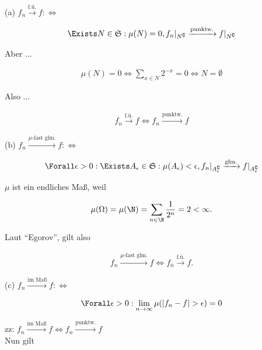 \begin{solution}

(a) $f_n \xrightarrow{\text{f.ü.}} f : \Leftrightarrow$

\begin{align*}
  \Exists N \in \mathfrak{S}:
  \mu(N) = 0,
  f_n|_{N^\complement} \xrightarrow{\text{punktw.}} f|_{N^\complement}
\end{align*}

Aber ...

\begin{align*}
  \mu(N) = 0
  \Leftrightarrow
  \sum_{x \in N} 2^{-x} = 0
  \Leftrightarrow
  N = \emptyset
\end{align*}

Also ...

\begin{align*}
  f_n \xrightarrow{\text{f.ü.}} f
  \Leftrightarrow
  f_n \xrightarrow{\text{punktw.}} f
\end{align*}

(b) $f_n \xrightarrow{\mu \text{-fast glm.}} f : \Leftrightarrow$

\begin{align*}
  \Forall \epsilon > 0:
  \Exists A_\epsilon \in \mathfrak{S}:
  \mu(A_\epsilon) < \epsilon,
  f_n|_{A_\epsilon^\complement} \xrightarrow{\text{glm.}} f|_{A_\epsilon^\complement}
\end{align*}

$\mu$ ist ein endliches Maß, weil

\begin{align*}
  \mu(\Omega) = \mu(\N) = \sum_{n \in \N} \frac{1}{2^n} = 2 < \infty.
\end{align*}

Laut \enquote{Egorov}, gilt also

\begin{align*}
  f_n \xrightarrow{\mu \text{-fast glm.}} f
  \Leftrightarrow
  f_n \xrightarrow{\text{f.ü.}} f.
\end{align*}

(c) $f_n \xrightarrow{\text{im Maß}} f : \Leftrightarrow$

\begin{align*}
  \Forall \epsilon > 0:
  \lim_{n \to \infty} \mu(|f_n - f| > \epsilon) = 0
\end{align*}

zz: $f_n \xrightarrow{\text{im Maß}} f \Leftrightarrow f_n \xrightarrow{\text{punktw.}} f$ \\

Nun gilt


\end{solution}
